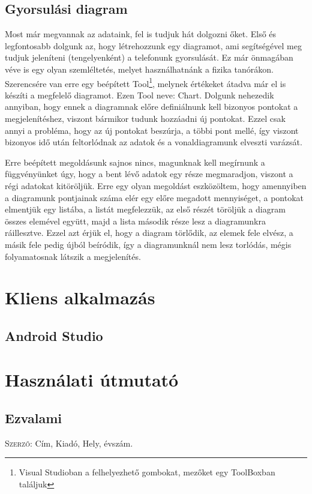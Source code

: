 \documentclass{thesis-ekf}
\theoremstyle{definition}
\theoremstyle{remark}
\begin{document}
\section{Gyorsulási diagram}
Most már megvannak az adataink, fel is tudjuk hát dolgozni őket. Első és legfontosabb dolgunk az, hogy létrehozzunk egy diagramot, ami segítségével meg tudjuk jeleníteni (tengelyenként) a telefonunk gyorsulását. Ez már önmagában véve is egy olyan szemléltetés, melyet használhatnánk a fizika tanórákon. Szerencsére van erre egy beépített Tool\footnote{Visual Studioban a felhelyezhető gombokat, mezőket egy ToolBoxban találjuk}, melynek értékeket átadva már el is készíti a megfelelő diagramot. Ezen Tool neve: Chart. Dolgunk nehezedik annyiban, hogy ennek a diagramnak előre definiálnunk kell bizonyos pontokat a megjelenítéshez, viszont bármikor tudunk hozzáadni új pontokat. Ezzel csak annyi a probléma, hogy az új pontokat beszúrja, a többi pont mellé, így viszont bizonyos idő után feltorlódnak az adatok és a vonaldiagramunk elveszti varázsát. 
\par Erre beépített megoldásunk sajnos nincs, magunknak kell megírnunk a függvényünket úgy, hogy a bent lévő adatok egy része megmaradjon, viszont a régi adatokat kitöröljük. Erre egy olyan megoldást eszközöltem, hogy amennyiben a diagramunk pontjainak száma elér egy előre megadott mennyiséget, a pontokat elmentjük egy listába, a listát megfelezzük, az első részét töröljük a diagram összes elemével együtt, majd a lista második része lesz a diagramunkra ráillesztve. Ezzel azt érjük el, hogy a diagram törlődik, az elemek fele elvész, a másik fele pedig újból beíródik, így a diagramunknál nem lesz torlódás, mégis folyamatosnak látszik a megjelenítés.
\chapter{Kliens alkalmazás}
\section{Android Studio}

\chapter{Használati útmutató}
\section{Ezvalami}

\begin{thebibliography}{1}
 \textsc{Szerző}: Cím, Kiadó, Hely, évszám.

\end{thebibliography}
\end{document}
